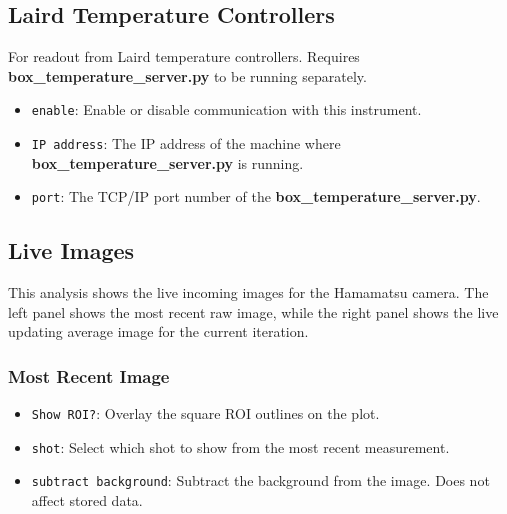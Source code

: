 \documentclass[pdftex,11pt,letterpaper]{article}
\begin{document}
\subsection{Laird Temperature Controllers}

For readout from Laird temperature controllers.  Requires \textbf{box\_temperature\_server.py} to be running separately.

\begin{itemize}
\item \texttt{enable}:  Enable or disable communication with this instrument.
\item \texttt{IP address}:  The IP address of the machine where \textbf{box\_temperature\_server.py} is running.
\item \texttt{port}: The TCP/IP port number of the \textbf{box\_temperature\_server.py}.

\end{itemize}

\subsection{Live Images}

This analysis shows the live incoming images for the Hamamatsu camera.  The left panel shows the most recent raw image, while the right panel shows the live updating average image for the current iteration.

\subsubsection{Most Recent Image}
\begin{itemize}
\item \texttt{Show ROI?}: Overlay the square ROI outlines on the plot.
\item \texttt{shot}:  Select which shot to show from the most recent measurement.
\item \texttt{subtract background}:  Subtract the background from the image.  Does not affect stored data.
\end{itemize}
\end{document}
